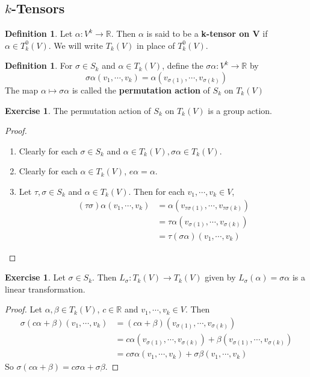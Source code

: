 \documentclass[12pt]{amsart}
\theoremstyle{definition}
\newtheorem{defn}[definition]{Definition}
\theoremstyle{definition}
\newtheorem{ex}[definition]{Exercise}
\newcommand{\al}{\alpha}
\newcommand{\sig}{\sigma}
\newcommand{\R}{\mathbb{R}}
\begin{document}
	
	
	
	\newpage
	\subsection{$k$-Tensors}	
	
	\begin{defn}
		Let $\al: V^k \rightarrow \R$. Then $\alpha$ is said to be a \textbf{k-tensor on V} if $\al \in T^0_k(V)$. We will write $T_k(V)$ in place of $T^0_k(V)$.
	\end{defn}

	\begin{defn}
		For $\sig \in S_k$ and $\al \in T_k(V)$, define the $\sig \al : V^k \rightarrow \R$ by $$\sig \al(v_1, \cdots, v_k) = \al(v_{\sig(1)}, \cdots, v_{\sig(k)})$$  The map $\al \mapsto \sig \al$ is called the \textbf{permutation action} of $S_k$ on $T_k(V)$
	\end{defn}

	\begin{ex}
		The permutation action of $S_k$ on $T_k(V)$ is a group action.
	\end{ex}

	\begin{proof} \
		\begin{enumerate}
			\item Clearly for each $\sig \in S_k$ and $\al \in T_k(V), \sig \al \in T_k(V) $.
			\item Clearly for each $\al \in T_k(V)$, $e \al = \al$.
			\item Let $\tau, \sig \in S_k$ and $\al \in T_k(V)$. Then for each $v_1, \cdots, v_k \in V$, 
			\begin{align*}
				(\tau \sig) \al(v_1, \cdots, v_k) 
				&= \al(v_{\tau \sig (1)}, \cdots, v_{\tau \sig (k)}) \\
				&= \tau \al(v_{ \sig (1)}, \cdots, v_{ \sig (k)}) \\ 
				&= \tau (\sig \al) (v_1, \cdots, v_k) 
			\end{align*}
		\end{enumerate}
	\end{proof}

	\begin{ex}
		Let $\sig \in S_k$. Then $L_{\sig}: T_k(V) \rightarrow T_k(V)$ given by $ L_{\sig}(\al) = \sig \al$ is a linear transformation.
	\end{ex}

	\begin{proof}
		Let $\al, \beta \in T_k(V)$, $c \in \R$ and $v_1, \cdots, v_k \in V$. Then 
		\begin{align*}
			\sig(c\al + \beta)(v_1, \cdots, v_k) 
			&= (c\al + \beta)(v_{\sig(1)}, \cdots, v_{\sig(k)}) \\
			&= c \al(v_{\sig(1)}, \cdots, v_{\sig(k)}) + \beta(v_{\sig(1)}, \cdots, v_{\sig(k)}) \\
			&= c \sig \al(v_1, \cdots, v_k) + \sig \beta(v_1, \cdots, v_k)
		\end{align*}
		So $\sig(c \al + \beta) = c\sig \al + \sig \beta$.
	\end{proof}
	
\end{document}
